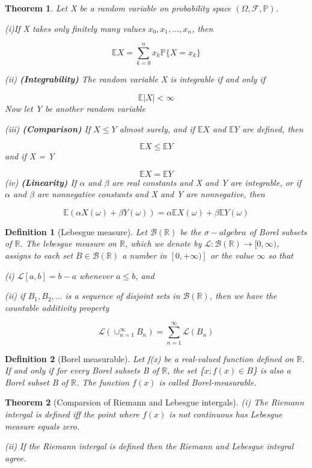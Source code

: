 \documentclass[a4]{article}
\newtheorem{theorem}{Theorem}
\newtheorem{definition}{Definition}
\begin{document}
\begin{theorem}
	Let X be a random variable on probability space $(\Omega, \mathcal{F}, \mathbb{P})$.\par 
	\bigbreak 
	(i)\label{countable_add} If X takes only finitely many values $x_{0}, x_{1},...,x_{n}$, then\par 
	$$
	\mathbb{E}X = \sum^{n}_{k = 0}x_{k}\mathbb{P}\{X = x_{k}\}
	$$\par 
	\bigbreak 
	(ii) \textbf{(Integrability)} The random variable X is integrable if and only if \par 
	$$
	\mathbb{E}|X|<\infty
	$$
	\noindent Now let Y be another random variable\par 
	\bigbreak 
	(iii) \textbf{(Comparison)} If $X\leq Y$ almost surely, and if $\mathbb{E}X$ and $\mathbb{E}Y$ are defined, then\par 
	$$
	\mathbb{E}X  \leq	\mathbb{E}Y
	$$
	and if X = Y\par 
	$$
	\mathbb{E}X  =	\mathbb{E}Y
		$$
	\bigbreak 
	(iv) \textbf{(Linearity)} If $\alpha$ and $\beta$ are real constants and X and Y are integrable, or if $\alpha$ and $\beta$ are nonnegative constants and X and Y are nonnegative, then \par
	$$
		\mathbb{E}(\alpha X(\omega) + \beta Y(\omega))= \alpha \mathbb{E}X(\omega) + \beta \mathbb{E}Y(\omega)
	$$
\end{theorem}
\begin{definition}[Lebesgue measure]
	Let $\mathcal{B}(\mathbb{R})$ be the $\sigma-algebra$ of Borel subsets of $\mathbb{R}$. The lebesgue measure on $\mathbb{R}$, which we denote by $\mathcal{L}: \mathcal{B}(\mathbb{R})\rightarrow [0,\infty)$, assigns to each set $B\in\mathcal{B}(\mathbb{R})$ a number in $[0,+\infty)]$ or the value $\infty$ so that\par 
	(i) $\mathcal{L}[a,b] = b - a$ whenever $a\leq b$, and\par 
	(ii) if $B_{1}, B_{2},...$ is a sequence of disjoint sets in $\mathcal{B}(\mathbb
	R)$, then we have the countable additivity property\par 
	$$
	\mathcal{L} \left(\cup_{n = 1}^{\infty}B_{n}\right) = \sum^{\infty}_{n = 1}\mathcal{L}(B_{n})
	$$
\end{definition}
\begin{definition}[Borel measurable]
Let f(x) be a real-valued function defined on $\mathbb{R}$. If and only if for every Borel subsets B of $\mathbb{R}$, the set \{$x; f(x)\in B$\} is also a Borel subset B of $\mathbb{R}$. The function $f(x)$ is called Borel-measurable.
\end{definition}
\begin{theorem}[Comparsion of Riemann and Lebesgue intergals]
	\quad  \bigbreak
	(i) The Riemann intergal is defined iff the point where $f(x)$ is not continuous has Lebesgue measure equals zero.\par 
	(ii) If the Riemann intergal is defined then the Riemann and Lebesgue integral agree.\par 
	
\end{theorem}
\end{document}
